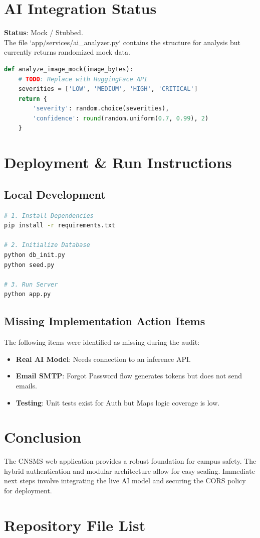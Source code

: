 \documentclass[12pt,a4paper]{article}
\begin{document}
\section{AI Integration Status}
\textbf{Status}: Mock / Stubbed. \\
The file `app/services/ai_analyzer.py` contains the structure for analysis but currently returns randomized mock data.

\begin{lstlisting}[language=Python, caption={Mock AI Logic}]
def analyze_image_mock(image_bytes):
    # TODO: Replace with HuggingFace API
    severities = ['LOW', 'MEDIUM', 'HIGH', 'CRITICAL']
    return {
        'severity': random.choice(severities),
        'confidence': round(random.uniform(0.7, 0.99), 2)
    }
\end{lstlisting}

\section{Deployment \& Run Instructions}
\subsection{Local Development}
\begin{lstlisting}[language=bash]
# 1. Install Dependencies
pip install -r requirements.txt

# 2. Initialize Database
python db_init.py
python seed.py

# 3. Run Server
python app.py
\end{lstlisting}

\subsection{Missing Implementation Action Items}
The following items were identified as missing during the audit:
\begin{itemize}
    \item \textbf{Real AI Model}: Needs connection to an inference API.
    \item \textbf{Email SMTP}: Forgot Password flow generates tokens but does not send emails.
    \item \textbf{Testing}: Unit tests exist for Auth but Maps logic coverage is low.
\end{itemize}

\section{Conclusion}
The CNSMS web application provides a robust foundation for campus safety. The hybrid authentication and modular architecture allow for easy scaling. Immediate next steps involve integrating the live AI model and securing the CORS policy for deployment.

\appendix
\section{Repository File List}

\end{document}
